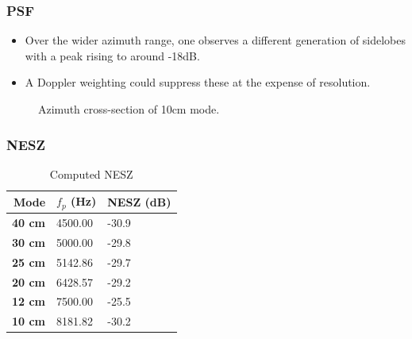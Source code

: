 \documentclass{beamer}
\begin{document}
%
\begin{frame}
\frametitle{PSF}
\begin{itemize}
\item Over the wider azimuth range, one observes a different generation of sidelobes with a peak rising to around -18dB. 
\item A Doppler weighting could suppress these at the expense of resolution.
\end{itemize}
\begin{figure}[ht!]
\begin{center}
 \caption{Azimuth cross-section of 10cm mode.}
 \label{fg:azimuthCross10wide}
 \end{center}
\end{figure}
\end{frame}
%
\begin{frame}
\frametitle{NESZ}
\begin{table}[ht!]
\begin{center}
 \caption{Computed NESZ}
 \label{tb:nesz}
 \begin{tabular}{r|l|l}
 {\bf Mode} & {\bf $f_p$} (Hz)& {\bf NESZ} (dB)\\\hline
 {\bf 40 cm} & 4500.00 & -30.9\\\hline
 {\bf 30 cm} & 5000.00 & -29.8\\\hline
 {\bf 25 cm} & 5142.86 & -29.7\\\hline
 {\bf 20 cm} & 6428.57 & -29.2\\\hline
 {\bf 12 cm} & 7500.00 & -25.5\\\hline
 {\bf 10 cm} & 8181.82 & -30.2\\\hline
 \end{tabular}
 \end{center}
\end{table}
\end{frame}
\end{document}
